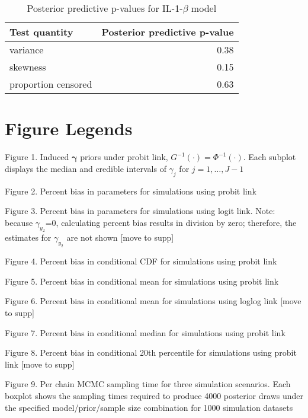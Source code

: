 \documentclass[
]{article}
\begin{document}
\begin{table}[!h]

\caption{\label{tab:ppptab2}Posterior predictive p-values for IL-1-$\beta$ model}
\centering
\begin{tabular}[t]{lr}
\toprule
Test quantity & Posterior predictive p-value\\
\midrule
variance & 0.38\\
skewness & 0.15\\
proportion censored & 0.63\\
\bottomrule
\end{tabular}
\end{table}

\newpage

\hypertarget{figure-legends}{%
\section*{Figure Legends}\label{figure-legends}}

Figure 1. Induced \(\boldsymbol{\gamma}\) priors under probit link, \(G^{-1}(\cdot)=\Phi^{-1}(\cdot)\). Each subplot displays the median and credible intervals of \(\gamma_j\) for \(j=1,\ldots,J-1\)

Figure 2. Percent bias in parameters for simulations using probit link

Figure 3. Percent bias in parameters for simulations using logit link. Note: because \(\gamma_{y_2}\)=0, calculating percent bias results in division by zero; therefore, the estimates for \(\gamma_{y_2}\) are not shown {[}move to supp{]}

Figure 4. Percent bias in conditional CDF for simulations using probit link

Figure 5. Percent bias in conditional mean for simulations using probit link

Figure 6. Percent bias in conditional mean for simulations using loglog link {[}move to supp{]}

Figure 7. Percent bias in conditional median for simulations using probit link

Figure 8. Percent bias in conditional 20th percentile for simulations using probit link {[}move to supp{]}

Figure 9. Per chain MCMC sampling time for three simulation scenarios. Each boxplot shows the sampling times required to produce 4000 posterior draws under the specified model/prior/sample size combination for 1000 simulation datasets
\end{document}
